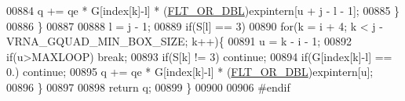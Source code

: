 \begin{DoxyCode}
00884       q += qe * G[index[k]-l] * (\hyperlink{group__data__structures_ga31125aeace516926bf7f251f759b6126}{FLT\_OR\_DBL})expintern[u + j - l - 1];
00885     \}
00886   \}
00887 
00888   l = j - 1;
00889   \textcolor{keywordflow}{if}(S[l] == 3)
00890     \textcolor{keywordflow}{for}(k = i + 4; k < j - VRNA\_GQUAD\_MIN\_BOX\_SIZE; k++)\{
00891       u    = k - i - 1;
00892       \textcolor{keywordflow}{if}(u>MAXLOOP) \textcolor{keywordflow}{break};
00893       \textcolor{keywordflow}{if}(S[k] != 3) \textcolor{keywordflow}{continue};
00894       \textcolor{keywordflow}{if}(G[index[k]-l] == 0.) \textcolor{keywordflow}{continue};
00895       q += qe * G[index[k]-l] * (\hyperlink{group__data__structures_ga31125aeace516926bf7f251f759b6126}{FLT\_OR\_DBL})expintern[u];
00896     \}
00897 
00898   \textcolor{keywordflow}{return} q;
00899 \}
00900 
00906 \textcolor{preprocessor}{#endif}
\end{DoxyCode}
